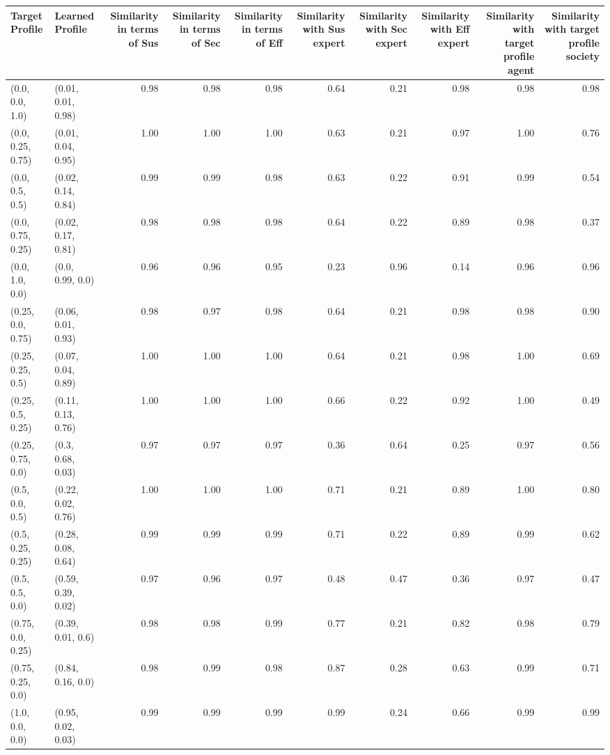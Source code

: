 \begin{tabular}{llrrrrrrrr}
\toprule
Target Profile & Learned Profile & Similarity in terms of Sus & Similarity in terms of Sec & Similarity in terms of Eff & Similarity with Sus expert & Similarity with Sec expert & Similarity with Eff expert & Similarity with target profile agent & Similarity with target profile society \\
\midrule
(0.0, 0.0, 1.0) & (0.01, 0.01, 0.98) & 0.98 & 0.98 & 0.98 & 0.64 & 0.21 & 0.98 & 0.98 & 0.98 \\
(0.0, 0.25, 0.75) & (0.01, 0.04, 0.95) & 1.00 & 1.00 & 1.00 & 0.63 & 0.21 & 0.97 & 1.00 & 0.76 \\
(0.0, 0.5, 0.5) & (0.02, 0.14, 0.84) & 0.99 & 0.99 & 0.98 & 0.63 & 0.22 & 0.91 & 0.99 & 0.54 \\
(0.0, 0.75, 0.25) & (0.02, 0.17, 0.81) & 0.98 & 0.98 & 0.98 & 0.64 & 0.22 & 0.89 & 0.98 & 0.37 \\
(0.0, 1.0, 0.0) & (0.0, 0.99, 0.0) & 0.96 & 0.96 & 0.95 & 0.23 & 0.96 & 0.14 & 0.96 & 0.96 \\
(0.25, 0.0, 0.75) & (0.06, 0.01, 0.93) & 0.98 & 0.97 & 0.98 & 0.64 & 0.21 & 0.98 & 0.98 & 0.90 \\
(0.25, 0.25, 0.5) & (0.07, 0.04, 0.89) & 1.00 & 1.00 & 1.00 & 0.64 & 0.21 & 0.98 & 1.00 & 0.69 \\
(0.25, 0.5, 0.25) & (0.11, 0.13, 0.76) & 1.00 & 1.00 & 1.00 & 0.66 & 0.22 & 0.92 & 1.00 & 0.49 \\
(0.25, 0.75, 0.0) & (0.3, 0.68, 0.03) & 0.97 & 0.97 & 0.97 & 0.36 & 0.64 & 0.25 & 0.97 & 0.56 \\
(0.5, 0.0, 0.5) & (0.22, 0.02, 0.76) & 1.00 & 1.00 & 1.00 & 0.71 & 0.21 & 0.89 & 1.00 & 0.80 \\
(0.5, 0.25, 0.25) & (0.28, 0.08, 0.64) & 0.99 & 0.99 & 0.99 & 0.71 & 0.22 & 0.89 & 0.99 & 0.62 \\
(0.5, 0.5, 0.0) & (0.59, 0.39, 0.02) & 0.97 & 0.96 & 0.97 & 0.48 & 0.47 & 0.36 & 0.97 & 0.47 \\
(0.75, 0.0, 0.25) & (0.39, 0.01, 0.6) & 0.98 & 0.98 & 0.99 & 0.77 & 0.21 & 0.82 & 0.98 & 0.79 \\
(0.75, 0.25, 0.0) & (0.84, 0.16, 0.0) & 0.98 & 0.99 & 0.98 & 0.87 & 0.28 & 0.63 & 0.99 & 0.71 \\
(1.0, 0.0, 0.0) & (0.95, 0.02, 0.03) & 0.99 & 0.99 & 0.99 & 0.99 & 0.24 & 0.66 & 0.99 & 0.99 \\
\bottomrule
\end{tabular}
